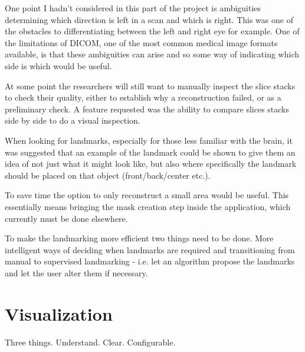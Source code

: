 One point I hadn't considered in this part of the project is ambiguities determining which direction is left in a scan and which is right. This was one of the obstacles to differentiating between the left and right eye for example. One of the limitations of DICOM, one of the most common medical image formats available, is that these ambiguities can arise and so some way of indicating which side is which would be useful.

At some point the researchers will still want to manually inspect the slice stacks to check their quality, either to establish why a reconstruction failed, or as a preliminary check. A feature requested was the ability to compare slices stacks side by side to do a visual inspection.

When looking for landmarks, especially for those less familiar with the brain, it was suggested that an example of the landmark could be shown to give them an idea of not just what it might look like, but also where specifically the landmark should be placed on that object (front/back/center etc.).

To save time the option to only reconstruct a small area would be useful. This essentially means bringing the mask creation step inside the application, which currently must be done elsewhere.

To make the landmarking more efficient two things need to be done. More intelligent ways of deciding when landmarks are required and transitioning from manual to supervised landmarking - i.e. let an algorithm propose the landmarks and let the user alter them if necessary.

\newpage
\section{Visualization}
Three things. Understand. Clear. Configurable.

